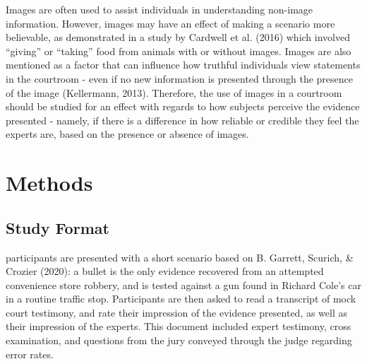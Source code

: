\documentclass[print]{nuthesis}
\begin{document}
Images are often used to assist individuals in understanding non-image information.
However, images may have an effect of making a scenario more believable, as demonstrated in a study by Cardwell et al. (2016) which involved ``giving'' or ``taking'' food from animals with or without images.
Images are also mentioned as a factor that can influence how truthful individuals view statements in the courtroom - even if no new information is presented through the presence of the image (Kellermann, 2013).
Therefore, the use of images in a courtroom should be studied for an effect with regards to how subjects perceive the evidence presented - namely, if there is a difference in how reliable or credible they feel the experts are, based on the presence or absence of images.

\hypertarget{methods}{%
\section{Methods}\label{methods}}

\hypertarget{study-format}{%
\subsection{Study Format}\label{study-format}}

 participants are presented with a short scenario based on B. Garrett, Scurich, \& Crozier (2020): a bullet is the only evidence recovered from an attempted convenience store robbery, and is tested against a gun found in Richard Cole's car in a routine traffic stop.
Participants are then asked to read a transcript of mock court testimony, and rate their impression of the evidence presented, as well as their impression of the experts.
This document included expert testimony, cross examination, and questions from the jury conveyed through the judge regarding error rates.
\end{document}
